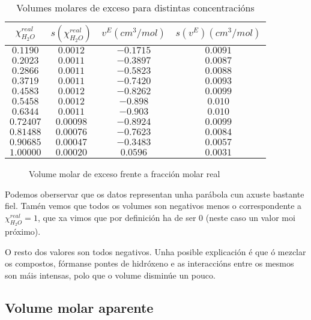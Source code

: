 \documentclass[12pt, a4paper, titlepage]{article}
\begin{document}
  \begin{table}[H]
    \centering
    \begin{tabular}{|c|c|c|c|}
    \hline
    $\chi_{H_2O}^{real}$ & $s(\chi_{H_2O}^{real})$ & $v^E (cm^3/mol)$ & $s(v^E) (cm^3/mol)$ \\ \hline
    $0.1190 $ & $0.0012$ & $-0.1715$ & $0.0091$ \\ \hline
    $0.2023 $ & $0.0011$ & $-0.3897$ & $0.0087$ \\ \hline
    $0.2866 $ & $0.0011$ & $-0.5823$ & $0.0088$ \\ \hline
    $0.3719 $ & $0.0011$ & $-0.7420$ & $0.0093$ \\ \hline
    $0.4583 $ & $0.0012$ & $-0.8262$ & $0.0099$ \\ \hline
    $0.5458 $ & $0.0012$ & $-0.898$ & $0.010$ \\ \hline
    $0.6344 $ & $0.0011$ & $-0.903$ & $0.010$ \\ \hline
    $0.72407 $ & $0.00098$ & $-0.8924$ & $0.0099$ \\ \hline
    $0.81488 $ & $0.00076$ & $-0.7623$ & $0.0084$ \\ \hline
    $0.90685 $ & $0.00047$ & $-0.3483$ & $0.0057$ \\ \hline
    $1.00000 $ & $0.00020$ & $0.0596$ & $0.0031$ \\ \hline
    \end{tabular}
    \caption{Volumes molares de exceso para distintas concentracións}
    \label{cad:volumes_molares_exceso_concentracions}
  \end{table}

  \begin{figure}[H]
    \hspace{-14pt}
    \resizebox{!}{8.5cm}{
    }
    \caption{Volume molar de exceso frente a fracción molar real}
    \label{fig:ve}
  \end{figure}

  Podemos oberservar que os datos representan unha parábola cun axuste bastante fiel. Tamén vemos que todos os volumes son negativos menos o correspondente a $\chi_{H_2O}^{real} = 1$, que xa vimos que por definición ha de ser $0$ (neste caso un valor moi próximo).
  
  O resto dos valores son todos negativos. Unha posible explicación é que ó mezclar os compostos, fórmanse pontes de hidróxeno e as interaccións entre os mesmos son máis intensas, polo que o volume disminúe un pouco.


  \subsection{Volume molar aparente}
  \label{sec:v_aparente}
\end{document}
